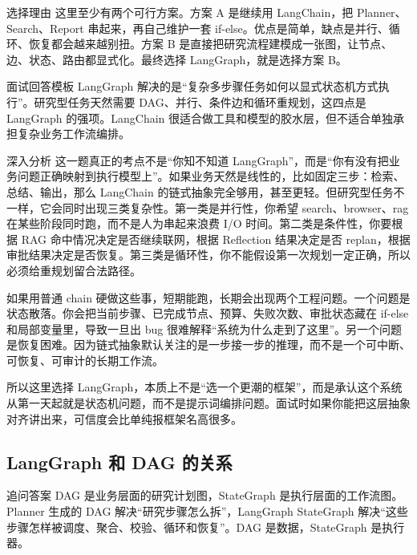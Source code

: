 \documentclass[12pt]{article}
\begin{document}
\begin{summaryBox}{选择理由}
这里至少有两个可行方案。方案 A 是继续用 LangChain，把 Planner、Search、Report 串起来，再自己维护一套 if-else。优点是简单，缺点是并行、循环、恢复都会越来越别扭。方案 B 是直接把研究流程建模成一张图，让节点、边、状态、路由都显式化。最终选择 LangGraph，就是选择方案 B。
\end{summaryBox}

\begin{qaBox}{面试回答模板}
LangGraph 解决的是“复杂多步骤任务如何以显式状态机方式执行”。研究型任务天然需要 DAG、并行、条件边和循环重规划，这四点是 LangGraph 的强项。LangChain 很适合做工具和模型的胶水层，但不适合单独承担复杂业务工作流编排。
\end{qaBox}

\begin{analysisBox}{深入分析}
这一题真正的考点不是“你知不知道 LangGraph”，而是“你有没有把业务问题正确映射到执行模型上”。如果业务天然是线性的，比如固定三步：检索、总结、输出，那么 LangChain 的链式抽象完全够用，甚至更轻。但研究型任务不一样，它会同时出现三类复杂性。第一类是并行性，你希望 search、browser、rag 在某些阶段同时跑，而不是人为串起来浪费 I/O 时间。第二类是条件性，你要根据 RAG 命中情况决定是否继续联网，根据 Reflection 结果决定是否 replan，根据审批结果决定是否恢复。第三类是循环性，你不能假设第一次规划一定正确，所以必须给重规划留合法路径。

如果用普通 chain 硬做这些事，短期能跑，长期会出现两个工程问题。一个问题是状态散落。你会把当前步骤、已完成节点、预算、失败次数、审批状态藏在 if-else 和局部变量里，导致一旦出 bug 很难解释“系统为什么走到了这里”。另一个问题是恢复困难。因为链式抽象默认关注的是一步接一步的推理，而不是一个可中断、可恢复、可审计的长期工作流。

所以这里选择 LangGraph，本质上不是“选一个更潮的框架”，而是承认这个系统从第一天起就是状态机问题，而不是提示词编排问题。面试时如果你能把这层抽象对齐讲出来，可信度会比单纯报框架名高很多。
\end{analysisBox}

\subsection{LangGraph 和 DAG 的关系}
\begin{qaBox}{追问答案}
DAG 是业务层面的研究计划图，StateGraph 是执行层面的工作流图。Planner 生成的 DAG 解决“研究步骤怎么拆”，LangGraph StateGraph 解决“这些步骤怎样被调度、聚合、校验、循环和恢复”。DAG 是数据，StateGraph 是执行器。
\end{qaBox}
\end{document}
